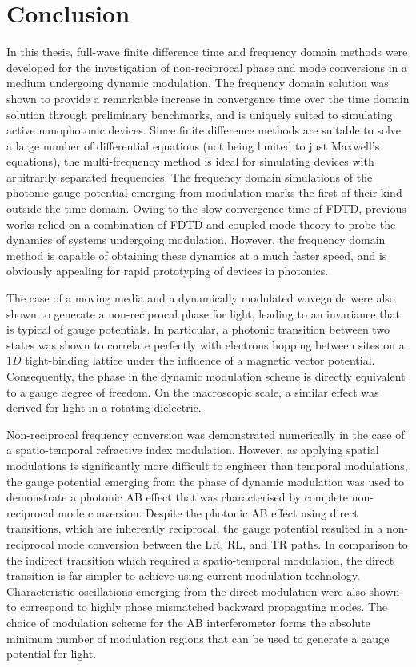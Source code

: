 \chapter*{Conclusion}
In this thesis, full-wave finite difference time and frequency domain methods were developed for the investigation of non-reciprocal phase and mode conversions in a medium undergoing dynamic modulation. The frequency domain solution was shown to provide a remarkable increase in convergence time over the time domain solution through preliminary benchmarks, and is uniquely suited to simulating active nanophotonic devices. Since finite difference methods are suitable to solve a large number of differential equations (not being limited to just Maxwell's equations), the multi-frequency method is ideal for simulating devices with arbitrarily separated frequencies. The frequency domain simulations of the photonic gauge potential emerging from modulation marks the first of their kind outside the time-domain. Owing to the slow convergence time of FDTD, previous works relied on a combination of FDTD and coupled-mode theory to probe the dynamics of systems undergoing modulation. However, the frequency domain method is capable of obtaining these dynamics at a much faster speed, and is obviously appealing for rapid prototyping of devices in photonics.

The case of a moving media and a dynamically modulated waveguide were also shown to generate a non-reciprocal phase for light, leading to an invariance that is typical of gauge potentials. In particular, a photonic transition between two states was shown to correlate perfectly with electrons hopping between sites on a $1D$ tight-binding lattice under the influence of a magnetic vector potential. Consequently, the phase in the dynamic modulation scheme is directly equivalent to a gauge degree of freedom. On the macroscopic scale, a similar effect was derived for light in a rotating dielectric.

Non-reciprocal frequency conversion was demonstrated numerically in the case of a spatio-temporal refractive index modulation. However, as applying spatial modulations is significantly more difficult to engineer than temporal modulations, the gauge potential emerging from the phase of dynamic modulation was used to demonstrate a photonic AB effect that was characterised by complete non-reciprocal mode conversion. Despite the photonic AB effect using direct transitions, which are inherently reciprocal, the gauge potential resulted in a non-reciprocal mode conversion between the LR, RL, and TR paths. In comparison to the indirect transition which required a spatio-temporal modulation, the direct transition is far simpler to achieve using current modulation technology. Characteristic oscillations emerging from the direct modulation were also shown to correspond to highly phase mismatched backward propagating modes. The choice of modulation scheme for the AB interferometer forms the absolute minimum number of modulation regions that can be used to generate a gauge potential for light.

